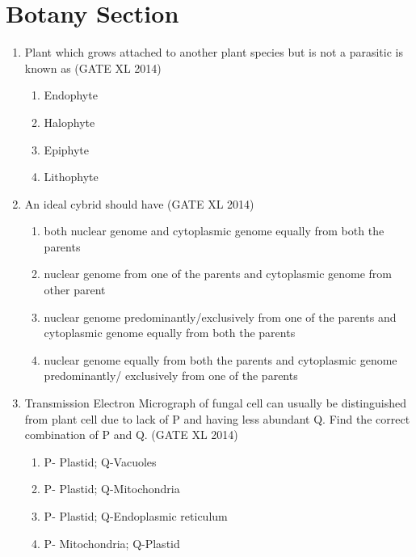 \documentclass[journal,12pt,onecolumn]{IEEEtran}
\theoremstyle{remark}
\begin{document}
\section*{{Botany Section}}
\begin{enumerate}

\item Plant which grows attached to another plant species but is not a parasitic is known as \hfill(GATE XL 2014)\\
\begin{multicols}{2}
\begin{enumerate}
\item Endophyte
\item Halophyte
\item Epiphyte
\item Lithophyte
\end{enumerate}
\end{multicols}

\item An ideal cybrid should have \hfill(GATE XL 2014)\\
\begin{multicols}{2}
\begin{enumerate}
\item both nuclear genome and cytoplasmic genome equally from both the parents
\item nuclear genome from one of the parents and cytoplasmic genome from other parent
\item nuclear genome predominantly/exclusively from one of the parents and cytoplasmic genome equally from both the parents
\item nuclear genome equally from both the parents and cytoplasmic genome predominantly/ exclusively from one of the parents
\end{enumerate}
\end{multicols}

\item Transmission Electron Micrograph of fungal cell can usually be distinguished from plant cell due to lack of P and having less abundant Q. Find the correct combination of P and Q. \hfill(GATE XL 2014)\\
\begin{multicols}{2}
\begin{enumerate}
\item P- Plastid; Q-Vacuoles
\item P- Plastid; Q-Mitochondria
\item P- Plastid; Q-Endoplasmic reticulum
\item P- Mitochondria; Q-Plastid
\end{enumerate}
\end{multicols}


\end{enumerate}
\end{document}
